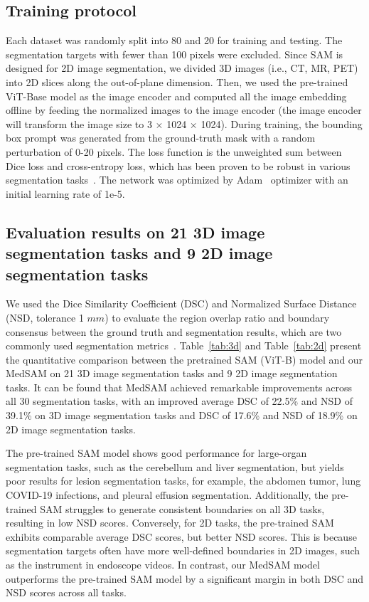 \documentclass[runningheads]{llncs}
\begin{document}
\subsection{Training protocol}
Each dataset was randomly split into 80 and 20 for training and testing. The segmentation targets with fewer than 100 pixels were excluded. Since SAM is designed for 2D image segmentation, we divided 3D images (i.e., CT, MR, PET) into 2D slices along the out-of-plane dimension. 
Then, we used the pre-trained ViT-Base model as the image encoder and computed all the image embedding offline by feeding the normalized images to the image encoder (the image encoder will transform the image size to 3 $\times$ 1024 $\times$ 1024).
During training, the bounding box prompt was generated from the ground-truth mask with a random perturbation of 0-20 pixels. 
The loss function is the unweighted sum between Dice loss and cross-entropy loss, which has been proven to be robust in various segmentation tasks~\cite{nnunet21}\cite{SegLossOdyssey}. The network was optimized by Adam~\cite{ADAM15} optimizer with an initial learning rate of 1e-5.

\subsection{Evaluation results on 21 3D image segmentation tasks and 9 2D image segmentation tasks}
We used the Dice Similarity Coefficient (DSC) and Normalized Surface Distance (NSD, tolerance 1 $mm$) to evaluate the region overlap ratio and boundary consensus between the ground truth and segmentation results, which are two commonly used segmentation metrics~\cite{metric-reload}. Table~\ref{tab:3d} and Table~\ref{tab:2d} present the quantitative comparison between the pretrained SAM (ViT-B) model and our MedSAM on 21 3D image segmentation tasks and 9 2D image segmentation tasks. It can be found that MedSAM achieved remarkable improvements across all 30 segmentation tasks, with an improved average DSC of 22.5\% and NSD of 39.1\% on 3D image segmentation tasks and DSC of 17.6\% and NSD of 18.9\% on 2D image segmentation tasks. 

The pre-trained SAM model shows good performance for large-organ segmentation tasks, such as the cerebellum and liver segmentation, but yields poor results for lesion segmentation tasks, for example, the abdomen tumor, lung COVID-19 infections, and pleural effusion segmentation. Additionally, the pre-trained SAM struggles to generate consistent boundaries on all 3D tasks, resulting in low NSD scores. Conversely, for 2D tasks, the pre-trained SAM exhibits comparable average DSC scores, but better NSD scores. This is because segmentation targets often have more well-defined boundaries in 2D images, such as the instrument in endoscope videos. In contrast, our MedSAM model outperforms the pre-trained SAM model by a significant margin in both DSC and NSD scores across all tasks.
\end{document}
